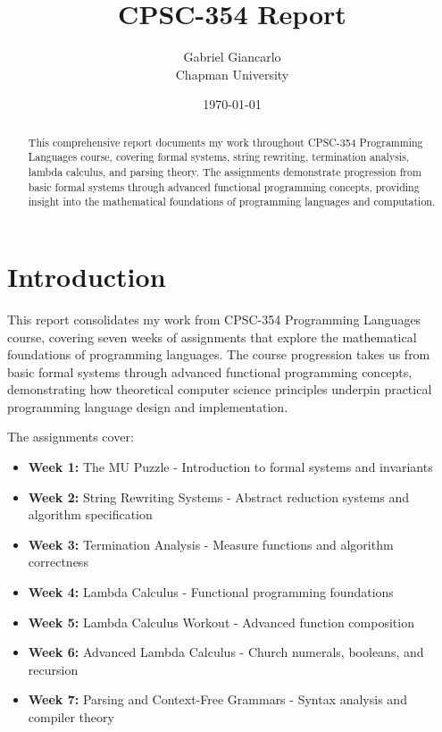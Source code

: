 \documentclass{article}
\title{CPSC-354 Report}
\author{Gabriel Giancarlo \\ Chapman University}
\date{\today}
\theoremstyle{plain}
\theoremstyle{definition}
\theoremstyle{remark}
\begin{document}
\maketitle

\begin{abstract}
This comprehensive report documents my work throughout CPSC-354 Programming Languages course, covering formal systems, string rewriting, termination analysis, lambda calculus, and parsing theory. The assignments demonstrate progression from basic formal systems through advanced functional programming concepts, providing insight into the mathematical foundations of programming languages and computation.
\end{abstract}

\setcounter{tocdepth}{3}
\tableofcontents

\section{Introduction}\label{intro}

This report consolidates my work from CPSC-354 Programming Languages course, covering seven weeks of assignments that explore the mathematical foundations of programming languages. The course progression takes us from basic formal systems through advanced functional programming concepts, demonstrating how theoretical computer science principles underpin practical programming language design and implementation.

The assignments cover:
\begin{itemize}
\item \textbf{Week 1:} The MU Puzzle - Introduction to formal systems and invariants
\item \textbf{Week 2:} String Rewriting Systems - Abstract reduction systems and algorithm specification
\item \textbf{Week 3:} Termination Analysis - Measure functions and algorithm correctness
\item \textbf{Week 4:} Lambda Calculus - Functional programming foundations
\item \textbf{Week 5:} Lambda Calculus Workout - Advanced function composition
\item \textbf{Week 6:} Advanced Lambda Calculus - Church numerals, booleans, and recursion
\item \textbf{Week 7:} Parsing and Context-Free Grammars - Syntax analysis and compiler theory
\end{itemize}
\end{document}
